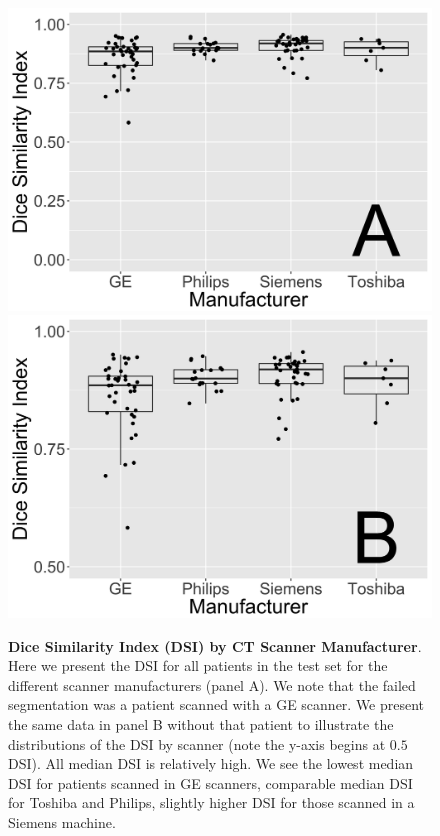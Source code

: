 \documentclass{elsarticle_nonatbib}\usepackage[]{graphicx}\usepackage[]{color}
\begin{document}

\begin{figure}
\centering
\includegraphics[width=0.48\linewidth,keepaspectratio]{DSI_Box_By_Manufacturer_A.png}
\includegraphics[width=0.48\linewidth,keepaspectratio]{DSI_Box_By_Manufacturer_B.png}
\caption{{\bf Dice Similarity Index (DSI) by CT Scanner Manufacturer}.  Here we present the DSI for all patients in the test set for the different scanner manufacturers (panel A). We note that the failed segmentation was a patient scanned with a GE scanner.  We present the same data in panel B without that patient to illustrate the distributions of the DSI by scanner (note the y-axis begins at $0.5$ DSI).  All median DSI is relatively high. We see the lowest median DSI for patients scanned in GE scanners, comparable median DSI for Toshiba and Philips, slightly higher DSI for those scanned in a Siemens machine. }
\label{fig:dsi_man}
\end{figure}
\end{document}
